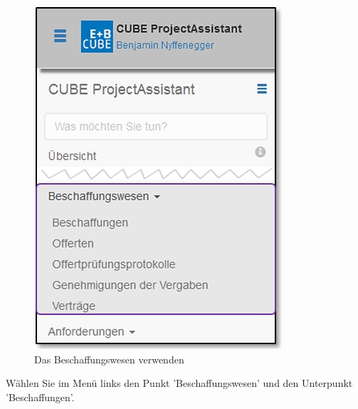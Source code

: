 \begin{figure}   %
  \vspace{-35pt}      %
  \begin{center}
    \includegraphics[width=1\linewidth]{../chapters/07_Beschaffungswesen/pictures/7-1-2_Menu_Beschaffungswesen.jpg}
  \end{center}
  \vspace{-20pt}
  \caption{Das Beschaffungswesen verwenden}
  \vspace{-10pt}
\end{figure}

Wählen Sie im Menü links den Punkt 'Beschaffungswesen' und den Unterpunkt 'Beschaffungen'. 

\vspace{5cm}

